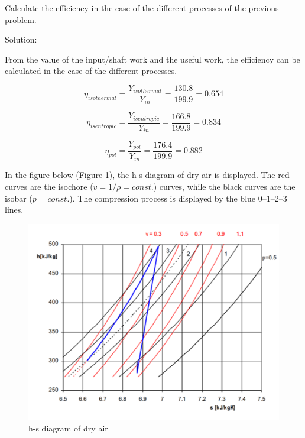 \vspace{1cm}
\begin{tcolorbox}

Calculate the efficiency in the case of the different processes of the previous problem.
\vspace{0.2cm}

Solution:
\vspace{0.2cm}

From the value of the input/shaft work and
the useful work, the efficiency can be calculated in the case of the different processes.

\begin{equation*}
	\eta_{isothermal}=\frac{Y_{isothermal}}{Y_{in}}=\frac{130.8}{199.9}=0.654
\end{equation*}

\begin{equation*}
	\eta_{isentropic}=\frac{Y_{isentropic}}{Y_{in}}=\frac{166.8}{199.9}=0.834
\end{equation*}

\begin{equation*}
	\eta_{pol}=\frac{Y_{pol}}{Y_{in}}=\frac{176.4}{199.9}=0.882
\end{equation*}

In the figure below (Figure \ref{gen_fig}), the h-s diagram of dry air is displayed. The red curves are the isochore
($v=1/\rho=const.$) curves, while the black curves are the isobar ($p=const.$). The compression
process is displayed by the blue 0–1–2–3 lines.
\end{tcolorbox}
\vspace{1cm}

\begin{figure}[ht]
\begin{center}
\includegraphics[scale=0.75]{figs/problem_1p5p11_fig.png}
\caption{\label{gen_fig}h-s diagram of dry air}
\end{center}
\end{figure}	

